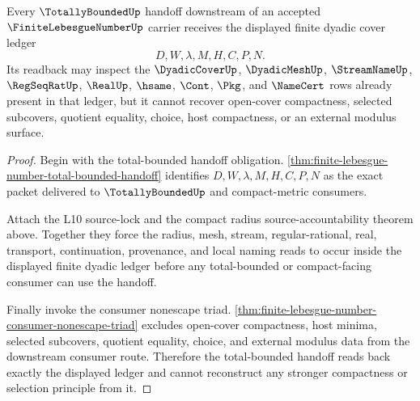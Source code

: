 \begin{theorem}
\label{thm:finite-lebesgue-number-total-bounded-ledger-readback}
Every $\TotallyBoundedUp$ handoff downstream of an accepted $\FiniteLebesgueNumberUp$ carrier receives the displayed finite dyadic cover ledger
$$
D,W,\lambda,M,H,C,P,N .
$$
Its readback may inspect the $\DyadicCoverUp$, $\DyadicMeshUp$, $\StreamNameUp$, $\RegSeqRatUp$, $\RealUp$, $\hsame$, $\Cont$, $\Pkg$, and $\NameCert$ rows already present in that ledger, but it cannot recover open-cover compactness, selected subcovers, quotient equality, choice, host compactness, or an external modulus surface.
\end{theorem}
\begin{proof}
Begin with the total-bounded handoff obligation. \autoref{thm:finite-lebesgue-number-total-bounded-handoff} identifies $D,W,\lambda,M,H,C,P,N$ as the exact packet delivered to $\TotallyBoundedUp$ and compact-metric consumers.

Attach the L10 source-lock and the compact radius source-accountability theorem above. Together they force the radius, mesh, stream, regular-rational, real, transport, continuation, provenance, and local naming reads to occur inside the displayed finite dyadic ledger before any total-bounded or compact-facing consumer can use the handoff.

Finally invoke the consumer nonescape triad. \autoref{thm:finite-lebesgue-number-consumer-nonescape-triad} excludes open-cover compactness, host minima, selected subcovers, quotient equality, choice, and external modulus data from the downstream consumer route. Therefore the total-bounded handoff reads back exactly the displayed ledger and cannot reconstruct any stronger compactness or selection principle from it.
\end{proof}
